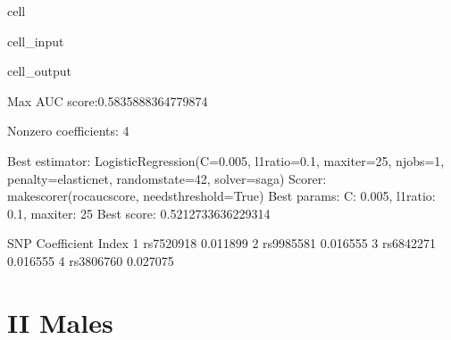 \documentclass[letterpaper,10pt,english]{jupyterBook}
\begin{document}
\begin{sphinxuseclass}{cell}
\begin{sphinxVerbatimInput}
\begin{sphinxuseclass}{cell_input}
\end{sphinxuseclass}\end{sphinxVerbatimInput}
\begin{sphinxVerbatimOutput}

\begin{sphinxuseclass}{cell_output}
\begin{sphinxVerbatim}[commandchars=\\\{\}]
Max AUC score:0.5835888364779874

Non\PYGZhy{}zero coefficients: 4

Best estimator: LogisticRegression(C=0.005, l1\PYGZus{}ratio=0.1, max\PYGZus{}iter=25, n\PYGZus{}jobs=\PYGZhy{}1,
                   penalty=\PYGZsq{}elasticnet\PYGZsq{}, random\PYGZus{}state=42, solver=\PYGZsq{}saga\PYGZsq{})
Scorer: make\PYGZus{}scorer(roc\PYGZus{}auc\PYGZus{}score, needs\PYGZus{}threshold=True)
Best params: \PYGZob{}\PYGZsq{}C\PYGZsq{}: 0.005, \PYGZsq{}l1\PYGZus{}ratio\PYGZsq{}: 0.1, \PYGZsq{}max\PYGZus{}iter\PYGZsq{}: 25\PYGZcb{}
Best score: 0.5212733636229314
\end{sphinxVerbatim}

\begin{sphinxVerbatim}[commandchars=\\\{\}]
             SNP Coefficient
Index                       
1      rs7520918   \PYGZhy{}0.011899
2      rs9985581    0.016555
3      rs6842271    0.016555
4      rs3806760    0.027075
\end{sphinxVerbatim}

\end{sphinxuseclass}\end{sphinxVerbatimOutput}

\end{sphinxuseclass}

\section{II Males}
\label{\detokenize{Cooper:ii-males}}
\end{document}
